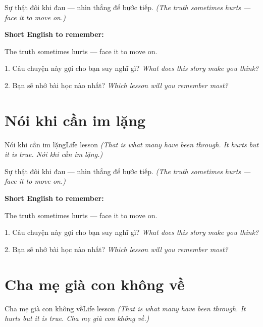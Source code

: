 \begin{baihoc}
Sự thật đôi khi đau — nhìn thẳng để bước tiếp.
\textit{(The truth sometimes hurts — face it to move on.)}
\end{baihoc}

\begin{ghinhoanh}
\textbf{Short English to remember:}

The truth sometimes hurts — face it to move on.

\end{ghinhoanh}

\begin{tuhocnhanh}
1. Câu chuyện này gợi cho bạn suy nghĩ gì? \textit{What does this story make you think?}

2. Bạn sẽ nhớ bài học nào nhất? \textit{Which lesson will you remember most?}
\end{tuhocnhanh}
\ngancach


\section{Nói khi cần im lặng}
\begin{truyen}{Nói khi cần im lặng}{Life lesson}
\textit{(That is what many have been through. It hurts but it is true. Nói khi cần im lặng.)}
\end{truyen}

\begin{baihoc}
Sự thật đôi khi đau — nhìn thẳng để bước tiếp.
\textit{(The truth sometimes hurts — face it to move on.)}
\end{baihoc}

\begin{ghinhoanh}
\textbf{Short English to remember:}

The truth sometimes hurts — face it to move on.

\end{ghinhoanh}

\begin{tuhocnhanh}
1. Câu chuyện này gợi cho bạn suy nghĩ gì? \textit{What does this story make you think?}

2. Bạn sẽ nhớ bài học nào nhất? \textit{Which lesson will you remember most?}
\end{tuhocnhanh}
\ngancach


\section{Cha mẹ già con không về}
\begin{truyen}{Cha mẹ già con không về}{Life lesson}
\textit{(That is what many have been through. It hurts but it is true. Cha mẹ già con không về.)}
\end{truyen}

